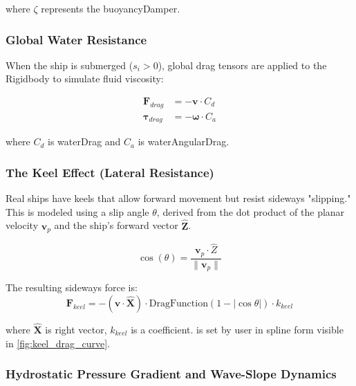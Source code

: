 where $\zeta$ represents the buoyancyDamper.







\subsubsection{Global Water Resistance}
When the ship is submerged ($s_i > 0$), global drag tensors are applied to the Rigidbody to simulate fluid viscosity:

\begin{align}
    \mathbf{F}_{drag} &= -\mathbf{v} \cdot C_d \\
    \mathbf{\tau}_{drag} &= -\mathbf{\omega} \cdot C_a
\end{align}

where $C_d$ is waterDrag and $C_a$ is waterAngularDrag.








\subsubsection{The Keel Effect (Lateral Resistance)}
Real ships have keels that allow forward movement but resist sideways "slipping." This is modeled using a slip angle $\theta$, derived from the dot product of the planar velocity $\mathbf{v}_p$ and the ship's forward vector $\hat{\mathbf{Z}}$.

    \begin{equation}
        \cos(\theta) = \frac{\mathbf{v}_p \cdot \hat{Z}}{\|\mathbf{v}_p\|}
    \end{equation}


    The resulting sideways force is:
    \begin{equation}
    \mathbf{F}_{keel} = -(\mathbf{v} \cdot \mathbf{\hat{X}}) \cdot \text{DragFunction}(1 - |\cos \theta|) \cdot k_{keel}
    \end{equation}


where $\mathbf{\hat{X}}$ is right vector, $k_{keel}$ is a coefficient.
 is set by user in spline form visible in \ref{fig:keel_drag_curve}.








\subsubsection{Hydrostatic Pressure Gradient and Wave-Slope Dynamics \label{sect:Wave-Slope-Dynamics}}

